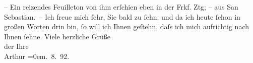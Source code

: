 \begin{ledgroupsized}[t]{13cm}
               – Ein reizendes Feuilleton von ihm erſchien eben
               in der Frkf. Ztg; – aus San Sebastian. –\pend
           \pstart
           Ich freue mich ſehr, Sie bald zu ſehn; und da ich heute ſchon in großen Worten drin
               bin, ſo will ich Ihnen geſtehn, daſs ich mich aufrichtig nach Ihnen ſehne.\pend
           \pstart
           {\pb} Viele herzliche Grüße{\\[\baselineskip]}der Ihre{\\[\baselineskip]}\spacefill\mbox{Arthur}\pend
           \leftskip=0em{}. 8. 92.\pend
           \endnumbering{}\end{ledgroupsized}  \newcommand{\dateiname}{L00116}\newcommand{\titel}{Arthur Schnitzler an Richard Beer-Hofmann, 22. 8. 1892}\newcommand{\editorInnen}{Martin Anton Müller und Gerd-Hermann Susen}
      